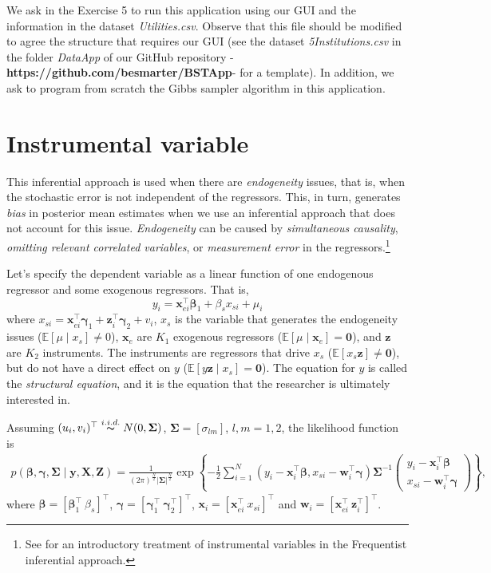 We ask in the Exercise 5 to run this application using our GUI and the information in the dataset \textit{Utilities.csv}. Observe that this file should be modified to agree the structure that requires our GUI (see the dataset \textit{5Institutions.csv} in the folder \textit{DataApp} of our GitHub repository -\textbf{https://github.com/besmarter/BSTApp}- for a template). In addition, we ask to program from scratch the Gibbs sampler algorithm in this application.  

\section{Instrumental variable}\label{sec73}

This inferential approach is used when there are \textit{endogeneity} issues, that is, when the stochastic error is not independent of the regressors. This, in turn, generates \textit{bias} in posterior mean estimates when we use an inferential approach that does not account for this issue. \textit{Endogeneity} can be caused by \textit{simultaneous causality}, \textit{omitting relevant correlated variables}, or \textit{measurement error} in the regressors.\footnote{See \cite[Chap. ~15]{wooldridge2016introductory} for an introductory treatment of instrumental variables in the Frequentist inferential approach.}

Let’s specify the dependent variable as a linear function of one endogenous regressor and some exogenous regressors. That is, 
\[
y_{i} = \bm{x}_{ei}^{\top}\bm{\beta}_1 + \beta_s x_{si} + \mu_{i}
\]
where \(x_{si} = \bm{x}_{ei}^{\top}\bm{\gamma}_1 + \bm{z}_i^{\top}\bm{\gamma}_2 + v_{i}\), \(x_s\) is the variable that generates the endogeneity issues (\(\mathbb{E}[\mu \mid x_{s}] \neq 0\)), \(\bm{x}_e\) are \(K_1\) exogenous regressors (\(\mathbb{E}[\mu \mid \bm{x}_{e}] = \bm{0}\)), and \(\bm{z}\) are \(K_2\) instruments. The instruments are regressors that drive \(x_s\) (\(\mathbb{E}[x_{s} \bm{z}] \neq \bm{0}\)), but do not have a direct effect on \(y\) (\(\mathbb{E}[y \bm{z} \mid x_s] = \bm{0}\)). The equation for \(y\) is called the \textit{structural equation}, and it is the equation that the researcher is ultimately interested in.

Assuming $(u_{i},v_i)^{\top}\stackrel{i.i.d.} {\thicksim} {N}(0,\bm{\Sigma})$, $\bm{\Sigma}=[\sigma_{lm}]$, $l,m=1,2$, the likelihood function is
\begin{align*}
	p(\bm{\beta},\bm{\gamma},\bm{\Sigma}\mid \bm{y},\bm{X},\bm{Z})=\frac{1}{(2\pi)^\frac{N}{2}|\bm{\Sigma}|^\frac{N}{2}}\exp\left\{-\frac{1}{2}\sum_{i=1}^N(y_i-\bm{x}_i^{\top}\bm{\beta}, x_{si} -\bm{w}_i^{\top}\bm{\gamma})\bm{\Sigma}^{-1}
	\begin{pmatrix}
		y_i-\bm{x}_i^{\top}\bm{\beta} \\
		x_{si}-\bm{w}_i^{\top}\bm{\gamma}
	\end{pmatrix}
	\right\},
\end{align*}
where $\bm{\beta}=\left[\bm{\beta}_1^{\top} \ \beta_s\right]^{\top}$, $\bm{\gamma}=\left[\bm{\gamma}_1^{\top} \ \bm{\gamma}_2^{\top}\right]^{\top}$, $\bm{x}_i=\left[\bm{x}_{ei}^{\top} \ x_{si}\right]^{\top}$ and $\bm{w}_i=\left[\bm{x}_{ei}^{\top} \ \bm{z}_{i}^{\top}\right]^{\top}$.

